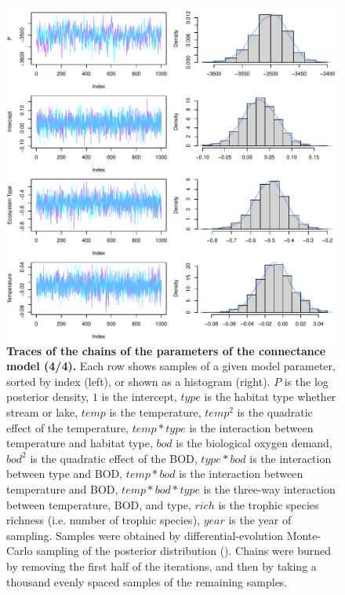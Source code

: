 \documentclass[11pt, oneside]{article}
\begin{document}
\begin{figure}[H]
\begin{center}
\includegraphics[page=4, width=1\linewidth]{scripts/b0_6_4/out_con/fig_tracePlot_beta.pdf}
\caption{
    \textbf{Traces of the chains of the parameters of the connectance model (4/4).}
    Each row shows samples of a given model parameter, sorted by index (left), or shown as a histogram (right).
    $P$ is the log posterior density, $1$ is the intercept, $type$ is the habitat type whether stream or lake, $temp$ is the temperature, $temp^2$ is the quadratic effect of the temperature, $temp * type$ is the interaction between temperature and habitat type, $bod$ is the biological oxygen demand, $bod^2$ is the quadratic effect of the BOD, $type * bod$ is the interaction between type and BOD, $temp * bod$ is the interaction between temperature and BOD, $temp * bod * type$ is the three-way interaction between temperature, BOD, and type, $rich$ is the trophic species richness (i.e. number of trophic species), $year$ is the year of sampling.
    Samples were obtained by differential-evolution Monte-Carlo sampling of the posterior distribution (\cite{TerBraak2006}).
    Chains were burned by removing the first half of the iterations, and then by taking a thousand evenly spaced samples of the remaining samples.
} 
\end{center}
\end{figure}
\end{document}
